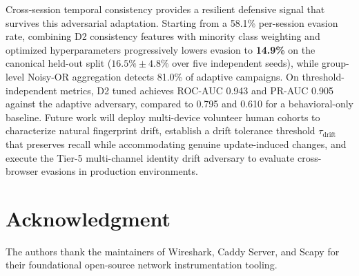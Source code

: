 \documentclass[conference]{IEEEtran}
\begin{document}
Cross-session temporal consistency provides a resilient defensive signal that survives this adversarial adaptation. Starting from a 58.1\% per-session evasion rate, combining D2 consistency features with minority class weighting and optimized hyperparameters progressively lowers evasion to \textbf{14.9\%} on the canonical held-out split ($16.5\% \pm 4.8\%$ over five independent seeds), while group-level Noisy-OR aggregation detects 81.0\% of adaptive campaigns. On threshold-independent metrics, D2 tuned achieves ROC-AUC 0.943 and PR-AUC 0.905 against the adaptive adversary, compared to 0.795 and 0.610 for a behavioral-only baseline. Future work will deploy multi-device volunteer human cohorts to characterize natural fingerprint drift, establish a drift tolerance threshold $\tau_\text{drift}$ that preserves recall while accommodating genuine update-induced changes, and execute the Tier-5 multi-channel identity drift adversary to evaluate cross-browser evasions in production environments.

\section*{Acknowledgment}
The authors thank the maintainers of Wireshark, Caddy Server, and Scapy for their foundational open-source network instrumentation tooling.
\end{document}
